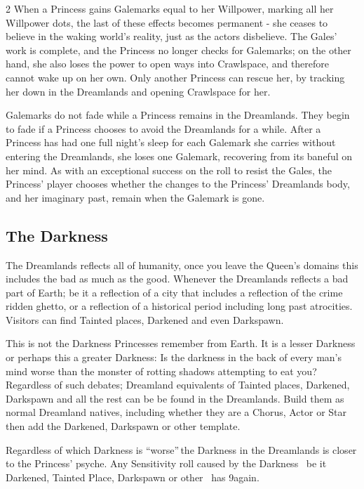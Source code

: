 \begin{multicols}{2}
When a Princess gains Galemarks equal to her Willpower, marking all her Willpower dots, the last of these effects becomes permanent - she ceases to believe in the waking world's reality, just as the actors disbelieve. The Gales' work is complete, and the Princess no longer checks for Galemarks; on the other hand, she also loses the power to open ways into Crawlspace, and therefore cannot wake up on her own. Only another Princess can rescue her, by tracking her down in the Dreamlands and opening Crawlspace for her.

Galemarks do not fade while a Princess remains in the Dreamlands. They begin to fade if a Princess chooses to avoid the Dreamlands for a while. After a Princess has had one full night's sleep for each Galemark she carries without entering the Dreamlands, she loses one Galemark, recovering from its baneful on her mind. As with an exceptional success on the roll to resist the Gales, the Princess' player chooses whether the changes to the Princess' Dreamlands body, and her imaginary past, remain when the Galemark is gone. 

\subsection*{The Darkness}
The Dreamlands reflects all of humanity, once you leave the Queen's domains this includes the bad as much as the good. Whenever the Dreamlands reflects a bad part of Earth; be it a reflection of a city that includes a reflection of the crime ridden ghetto, or a reflection of a historical period including long past atrocities. Visitors can find Tainted places, Darkened and even Darkspawn.

This is not the Darkness Princesses remember from Earth. It is a lesser Darkness or perhaps this a greater Darkness: Is the darkness in the back of every man's mind worse than the monster of rotting shadows attempting to eat you? Regardless of such debates; Dreamland equivalents of Tainted places, Darkened, Darkspawn and all the rest can be be found in the Dreamlands. Build them as normal Dreamland natives, including whether they are a Chorus, Actor or Star then add the Darkened, Darkspawn or other template.

Regardless of which Darkness is \textquotedblleft worse\textquotedblright\,the Darkness in the Dreamlands is closer to the Princess' psyche. Any Sensitivity roll caused by the Darkness \textendash\, be it Darkened, Tainted Place, Darkspawn or other \textendash\, has 9again.


\end{multicols}
